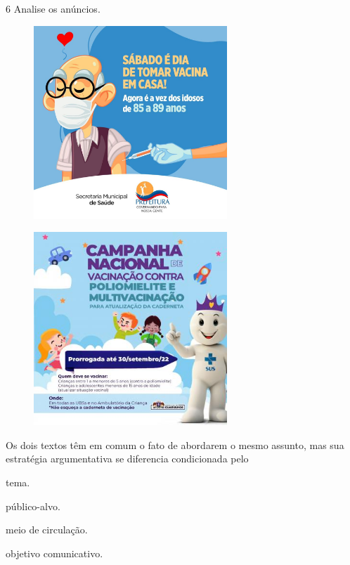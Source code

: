 \num{6} Analise os anúncios.

\begin{figure}[H]
\centering
\includegraphics[height=2.86458in]{./imgSAEB_8_POR/media/image29.png}
\end{figure}

\begin{figure}[H]
\centering
\includegraphics[height=2.86458in]{./imgSAEB_8_POR/media/image30.png}
\end{figure}

Os dois textos têm em comum o fato de abordarem o mesmo assunto, mas sua
estratégia argumentativa se diferencia condicionada pelo

\begin{escolha}
\item tema.

\item público-alvo.

\item meio de circulação.

\item objetivo comunicativo.
\end{escolha}

